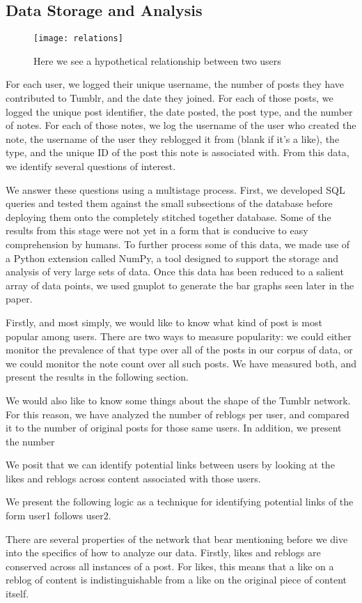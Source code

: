 \subsection{Data Storage and Analysis}
\begin{figure*}
\centering
\texttt{[image: relations]}
 \caption{Here we see a hypothetical relationship between two users}
 \label{fig:relations}
\end{figure*}
For each user, we logged their unique username, the number of posts 
they have contributed to Tumblr, and the date they joined. 
For each of those posts, we logged the unique post identifier, the 
date posted, the post type, and the number of notes.
For each of those notes, we log the username of the user who created 
the note, the username of the user they reblogged it from (blank if 
it's a like), the type, and the unique ID of the post this note is 
associated with.  From this data, we identify several questions of 
interest.

We answer these questions using a multistage process.  First, we 
developed SQL queries and tested them against the small subsections 
of the database before deploying them onto the completely stitched 
together database.  Some of the results from this stage were not yet 
in a form that is conducive to easy comprehension by humans.  To 
further process some of this data, we made use of a Python extension 
called NumPy, a tool designed to support the storage and analysis of 
very large sets of data.  Once this data has been reduced to a salient 
array of data points, we used gnuplot to generate the bar graphs seen 
later in the paper.


Firstly, and most simply, we would like to know what kind of post is 
most popular among users.  There are two ways to measure popularity: we 
could either monitor the prevalence of that type over all of the posts 
in our corpus of data, or we could monitor the note count over all such 
posts.  We have measured both, and present the results in the following 
section.

We would also like to know some things about the shape of the Tumblr 
network.  For this reason, we have analyzed the number of reblogs per 
user, and compared it to the number of original posts for those same 
users.  In addition, we present the number


We posit that we can identify potential links between users by looking 
at the likes and reblogs across content associated with those users.


We present the following logic as a technique for identifying potential 
links of the form user1 follows user2.


There are several properties of the network that bear mentioning before 
we dive into the specifics of how to analyze our data.  Firstly, likes 
and reblogs are conserved across all instances of a post.  For likes, 
this means that a like on a reblog of content is indistinguishable from 
a like on the original piece of content itself.
